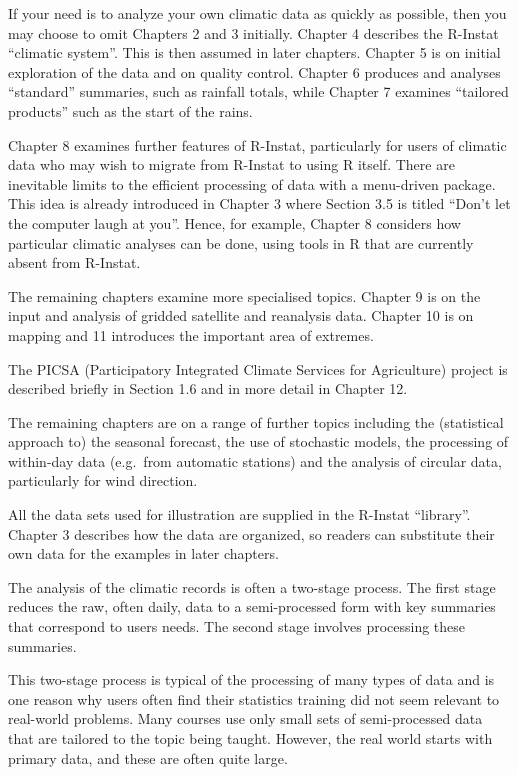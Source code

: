 \documentclass[
  letterpaper,
  DIV=11,
  numbers=noendperiod]{scrreprt}
\begin{document}
If your need is to analyze your own climatic data as quickly as
possible, then you may choose to omit Chapters 2 and 3 initially.
Chapter 4 describes the R-Instat ``climatic system''. This is then
assumed in later chapters. Chapter 5 is on initial exploration of the
data and on quality control. Chapter 6 produces and analyses
``standard'' summaries, such as rainfall totals, while Chapter 7
examines ``tailored products'' such as the start of the rains.

Chapter 8 examines further features of R-Instat, particularly for users
of climatic data who may wish to migrate from R-Instat to using R
itself. There are inevitable limits to the efficient processing of data
with a menu-driven package. This idea is already introduced in Chapter 3
where Section 3.5 is titled ``Don't let the computer laugh at you''.
Hence, for example, Chapter 8 considers how particular climatic analyses
can be done, using tools in R that are currently absent from R-Instat.

The remaining chapters examine more specialised topics. Chapter 9 is on
the input and analysis of gridded satellite and reanalysis data. Chapter
10 is on mapping and 11 introduces the important area of extremes.

The PICSA (Participatory Integrated Climate Services for Agriculture)
project is described briefly in Section 1.6 and in more detail in
Chapter 12.

The remaining chapters are on a range of further topics including the
(statistical approach to) the seasonal forecast, the use of stochastic
models, the processing of within-day data (e.g.~from automatic stations)
and the analysis of circular data, particularly for wind direction.

All the data sets used for illustration are supplied in the R-Instat
``library''. Chapter 3 describes how the data are organized, so readers
can substitute their own data for the examples in later chapters.

The analysis of the climatic records is often a two-stage process. The
first stage reduces the raw, often daily, data to a semi-processed form
with key summaries that correspond to users\textquotesingle{} needs. The
second stage involves processing these summaries.

This two-stage process is typical of the processing of many types of
data and is one reason why users often find their statistics training
did not seem relevant to real-world problems. Many courses use only
small sets of semi-processed data that are tailored to the topic being
taught. However, the real world starts with primary data, and these are
often quite large.
\end{document}

